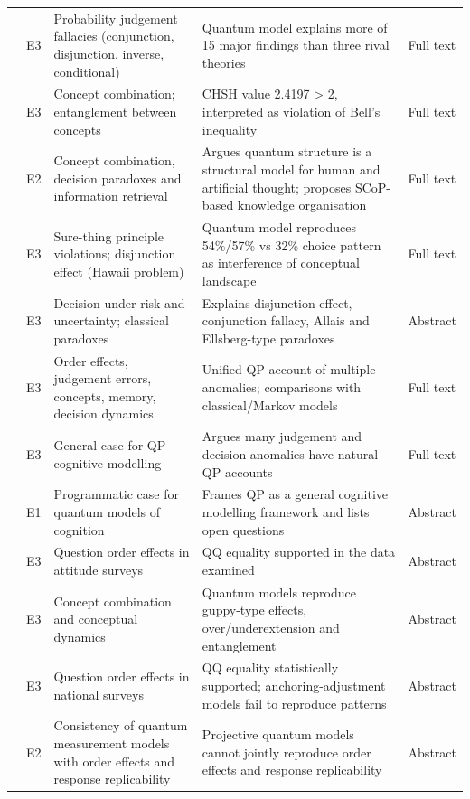 \documentclass[10pt,a4paper]{article}
\begin{document}
\begin{longtable}{@{}P{3.6cm}P{0.7cm}P{4.6cm}P{6.2cm}P{1.1cm}@{}}
\citet{Busemeyer2011} & E3 & Probability judgement fallacies (conjunction, disjunction, inverse, conditional) & Quantum model explains more of 15 major findings than three rival theories & Full text \\
\citet{Aerts2011a} & E3 & Concept combination; entanglement between concepts & CHSH value 2.4197 > 2, interpreted as violation of Bell's inequality & Full text \\
\citet{Aerts2011b} & E2 & Concept combination, decision paradoxes and information retrieval & Argues quantum structure is a structural model for human and artificial thought; proposes SCoP-based knowledge organisation & Full text \\
\citet{Aerts2011c} & E3 & Sure-thing principle violations; disjunction effect (Hawaii problem) & Quantum model reproduces 54\%/57\% vs 32\% choice pattern as interference of conceptual landscape & Full text \\
\citet{Yukalov2011} & E3 & Decision under risk and uncertainty; classical paradoxes & Explains disjunction effect, conjunction fallacy, Allais and Ellsberg-type paradoxes & Abstract \\
\citet{Busemeyer2012} & E3 & Order effects, judgement errors, concepts, memory, decision dynamics & Unified QP account of multiple anomalies; comparisons with classical/Markov models & Full text \\
\citet{Pothos2013a} & E3 & General case for QP cognitive modelling & Argues many judgement and decision anomalies have natural QP accounts & Full text \\
\citet{Wang2013a} & E1 & Programmatic case for quantum models of cognition & Frames QP as a general cognitive modelling framework and lists open questions & Abstract \\
\citet{Wang2013b} & E3 & Question order effects in attitude surveys & QQ equality supported in the data examined & Abstract \\
\citet{Aerts2013} & E3 & Concept combination and conceptual dynamics & Quantum models reproduce guppy-type effects, over/underextension and entanglement & Abstract \\
\citet{Wang2014} & E3 & Question order effects in national surveys & QQ equality statistically supported; anchoring-adjustment models fail to reproduce patterns & Abstract \\
\citet{Khrennikov2014} & E2 & Consistency of quantum measurement models with order effects and response replicability & Projective quantum models cannot jointly reproduce order effects and response replicability & Abstract \\

\end{longtable}
\end{document}
